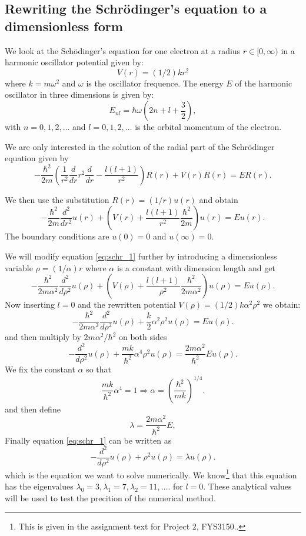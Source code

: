 \documentclass[11pt,a4wide]{article}
\begin{document}
\subsection{Rewriting the Schr\"odinger's equation to a dimensionless form} \label{sec:rewrite_sch}
We look at the Sch\"odinger's equation for one electron at a radius $r\in [0,\infty)$ in a harmonic oscillator potential given by: 
\[
V(r)= (1/2)kr^2
\]
where $k=m\omega^2$ and $\omega$ is the oscillator frequence. The energy $E$ of the harmonic oscillator in three dimensions is given by:
\[
E_{nl}=  \hbar \omega \left(2n+l+\frac{3}{2}\right),
\]
with $n=0,1,2,\dots$ and $l=0,1,2,\dots$ is the orbital momentum of the electron. 

We are only interested in the solution of the radial part of the Schr\"odinger equation given by
\begin{equation}
  -\frac{\hbar^2}{2 m} \left ( \frac{1}{r^2} \frac{d}{dr} r^2
  \frac{d}{dr} - \frac{l (l + 1)}{r^2} \right )R(r) 
     + V(r) R(r) = E R(r).
     \label{eq:schr_1}
\end{equation}

We then use the substitution $R(r) = (1/r) u(r)$ and obtain
\[
  -\frac{\hbar^2}{2 m} \frac{d^2}{dr^2} u(r) 
       + \left ( V(r) + \frac{l (l + 1)}{r^2}\frac{\hbar^2}{2 m}
                                    \right ) u(r)  = E u(r) .
\]
The boundary conditions are $u(0)=0$ and $u(\infty)=0$.

We will modify equation \ref{eq:schr_1} further by introducing a dimensionless variable $\rho = (1/\alpha) r$ where $\alpha$ is a constant with dimension length and get
% 
\[
  -\frac{\hbar^2}{2 m \alpha^2} \frac{d^2}{d\rho^2} u(\rho) 
       + \left ( V(\rho) + \frac{l (l + 1)}{\rho^2}
         \frac{\hbar^2}{2 m\alpha^2} \right ) u(\rho)  = E u(\rho) .
\]
%
Now inserting $l=0$ and the rewritten potential $V(\rho) = (1/2) k \alpha^2\rho^2$ we obtain:
\[
  -\frac{\hbar^2}{2 m \alpha^2} \frac{d^2}{d\rho^2} u(\rho) 
       + \frac{k}{2} \alpha^2\rho^2u(\rho)  = E u(\rho) .
\]
and then multiply by $2m\alpha^2/\hbar^2$ on both sides
\[
  -\frac{d^2}{d\rho^2} u(\rho) 
       + \frac{mk}{\hbar^2} \alpha^4\rho^2u(\rho)  = \frac{2m\alpha^2}{\hbar^2}E u(\rho) .
\]
We fix the constant $\alpha$ so that
\[
\frac{mk}{\hbar^2} \alpha^4 = 1 \Rightarrow \alpha = \left(\frac{\hbar^2}{mk}\right)^{1/4}.
\]
and then define 
\[
\lambda = \frac{2m\alpha^2}{\hbar^2}E,
\]
Finally equation \ref{eq:schr_1} can be written as
\begin{equation}
  -\frac{d^2}{d\rho^2} u(\rho) + \rho^2u(\rho)  = \lambda u(\rho) .
  \label{eq: sch_1D_final}
\end{equation}
which is the equation we want to solve numerically. We know\footnote{This is given in the assignment text for Project 2, FYS3150..} that this equation has the eigenvalues $\lambda_0=3,\lambda_1=7,\lambda_2=11,\dots .$ for $l=0$. These analytical values will be used to test the precition of the numerical method.
\end{document}
